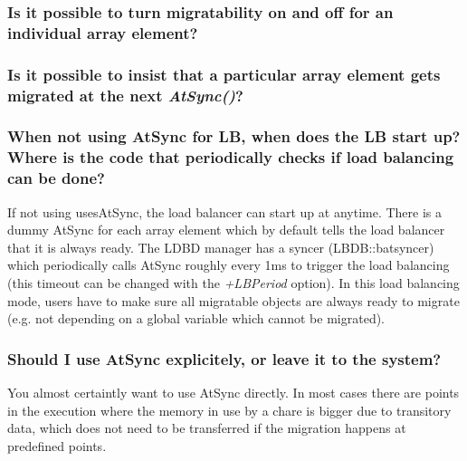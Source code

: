 \subsubsection{Is it possible to turn migratability on and off for an individual array
element?}



\subsubsection{Is it possible to insist that a particular array element gets migrated
at the next {\em AtSync()}?}



\subsubsection{When not using \textrm{AtSync} for LB, when does the LB start
up? Where is the code that periodically checks if load balancing can be
done?}

If not using \textrm{usesAtSync}, the load balancer can start up at
anytime. There is a dummy \textrm{AtSync} for each array element which
by default tells the load balancer that it is always ready. The LDBD manager
has a syncer (\textrm{LBDB::batsyncer}) which periodically calls \textrm{AtSync}
roughly every 1ms to trigger the load balancing (this timeout can be changed
with the {\em +LBPeriod} option). In this load balancing
mode, users have to make sure all migratable objects are always ready to
migrate (e.g. not depending on a global variable which cannot be migrated).

\subsubsection{Should I use AtSync explicitely, or leave it to the system?}

You almost certaintly want to use AtSync directly. In most cases there are
points in the execution where the memory in use by a chare is bigger due to
transitory data, which does not need to be transferred if the migration happens
at predefined points.


